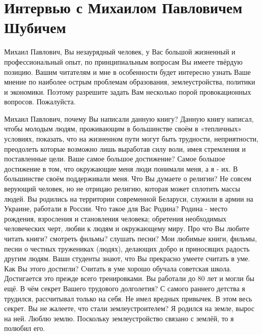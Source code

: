 ﻿\chapter[Интервью с М.\,П.~Шубичем]{Интервью с Михаилом Павловичем Шубичем}

\begin{drama}
	\setlength{\speaksindent}{5em}
	\setlength{\Dlabelsep}{5em}
	
	\maxspeaks Михаил Павлович, Вы незаурядный человек, у Вас большой жизненный и профессиональный опыт, по принципиальным вопросам Вы имеете твёрдую позицию. Вашим читателям и мне в особенности будет интересно узнать Ваше мнение по наиболее острым проблемам образования, землеустройства, политики и экономики. Поэтому разрешите задать Вам несколько порой провокационных вопросов.
	\michaelspeaks Пожалуйста.
	
	\maxspeaks Михаил Павлович, почему Вы написали данную книгу?
	\michaelspeaks Данную книгу написал, чтобы молодым людям, проживающим в большинстве своём в «тепличных» условиях, показать, что на жизненном пути могут быть трудности, неприятности, преодолеть которые возможно лишь выработав силу воли, имея стремления и поставленные цели.
	\maxspeaks Ваше самое большое достижение?
	\michaelspeaks Самое большое достижение в том, что окружающие меня люди понимали меня, а я - их. В большинстве своём поддерживали меня.
	\maxspeaks Что Вы думаете о религии? 
	\michaelspeaks Не совсем верующий человек, но не отрицаю религию, которая может сплотить массы людей.
	\maxspeaks Вы родились на территории современной Беларуси, служили в армии на Украине, работали в России. Что такое для Вас Родина?
	\michaelspeaks Родина - место рождения, взросления и становления человека; обретения необходимых человеческих черт, любви к людям и окружающему миру.
	\maxspeaks Про что Вы любите читать книги? смотреть фильмы? слушать песни?
	\michaelspeaks Мои любимые книги, фильмы, песни о честных тружениках (людях), делающих добро и приносящих радость другим людям.
	\maxspeaks Ваши студенты знают, что Вы прекрасно умеете считать в уме. Как Вы этого достигли?
	\michaelspeaks Считать в уме хорошо обучала советская школа. Достигается это прежде всего тренировками.
	\maxspeaks Вы работали до 80 лет и могли бы ещё. В чём секрет Вашего трудового долголетия?
	\michaelspeaks С самого раннего детства я трудился, рассчитывал только на себя. Не имел вредных привычек. В этом весь секрет. 
	\maxspeaks Вы не жалеете, что стали землеустроителем?
	\michaelspeaks Я родился на земле, вырос на ней. Люблю землю. Поскольку землеустройство связано с землёй, то я полюбил его.
	

\end{drama}
